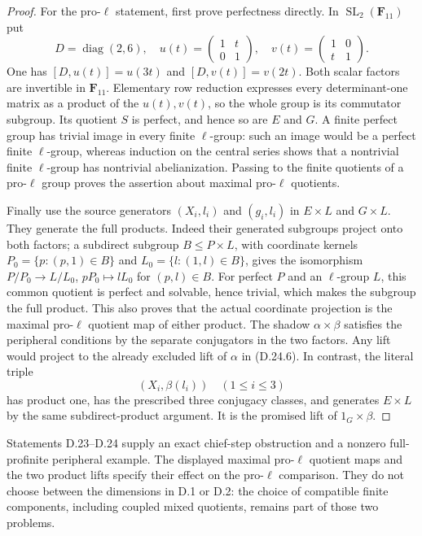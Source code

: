 \begin{proof}
For the pro-$\ell$ statement, first prove perfectness directly.
In $\operatorname{SL}_2(\mathbf F_{11})$ put
\[
 D=\operatorname{diag}(2,6),\quad
 u(t)=\begin{pmatrix}1&t\\0&1\end{pmatrix},\quad
 v(t)=\begin{pmatrix}1&0\\t&1\end{pmatrix}.
\]
One has $[D,u(t)]=u(3t)$ and $[D,v(t)]=v(2t)$.
Both scalar factors are invertible in $\mathbf F_{11}$.
Elementary row reduction expresses every determinant-one matrix
as a product of the $u(t),v(t)$, so the whole group is its
commutator subgroup.  Its quotient $S$ is perfect, and hence
so are $E$ and $G$.  A finite perfect group has trivial image
in every finite $\ell$-group: such an image would be a perfect
finite $\ell$-group, whereas induction on the central series
shows that a nontrivial finite $\ell$-group has nontrivial
abelianization.  Passing to the finite quotients of a pro-$\ell$
group proves the assertion about maximal pro-$\ell$ quotients.

Finally use the source generators $(X_i,l_i)$ and $(g_i,l_i)$
in $E\times L$ and $G\times L$.  They generate the full products.
Indeed their generated subgroups project onto both factors; a
subdirect subgroup $B\leq P\times L$, with coordinate kernels
$P_0=\{p:(p,1)\in B\}$ and $L_0=\{l:(1,l)\in B\}$, gives
the isomorphism $P/P_0\to L/L_0$, $pP_0\mapsto lL_0$ for
$(p,l)\in B$.  For perfect
$P$ and an $\ell$-group $L$, this common quotient is perfect
and solvable, hence trivial, which makes the subgroup the full
product.  This also proves that the actual coordinate projection
is the maximal pro-$\ell$ quotient map of either product.
The shadow $\alpha\times\beta$ satisfies the peripheral
conditions by the separate conjugators in the two factors.
Any lift would project to the already excluded lift of $\alpha$
in \textup{(D.24.6)}.  In contrast, the literal triple
\[
 (X_i,\beta(l_i))\quad(1\leq i\leq3)
 \tag{D.24.7}
\]
has product one, has the prescribed three conjugacy classes,
and generates $E\times L$ by the same subdirect-product
argument.  It is the promised lift of $1_G\times\beta$.
\end{proof}

Statements D.23--D.24 supply an exact chief-step obstruction and
a nonzero full-profinite peripheral example.  The displayed
maximal pro-$\ell$ quotient maps and the two product lifts specify
their effect on the pro-$\ell$ comparison.  They do not choose
between the dimensions in D.1 or D.2: the choice of compatible
finite components, including coupled mixed quotients, remains
part of those two problems.
